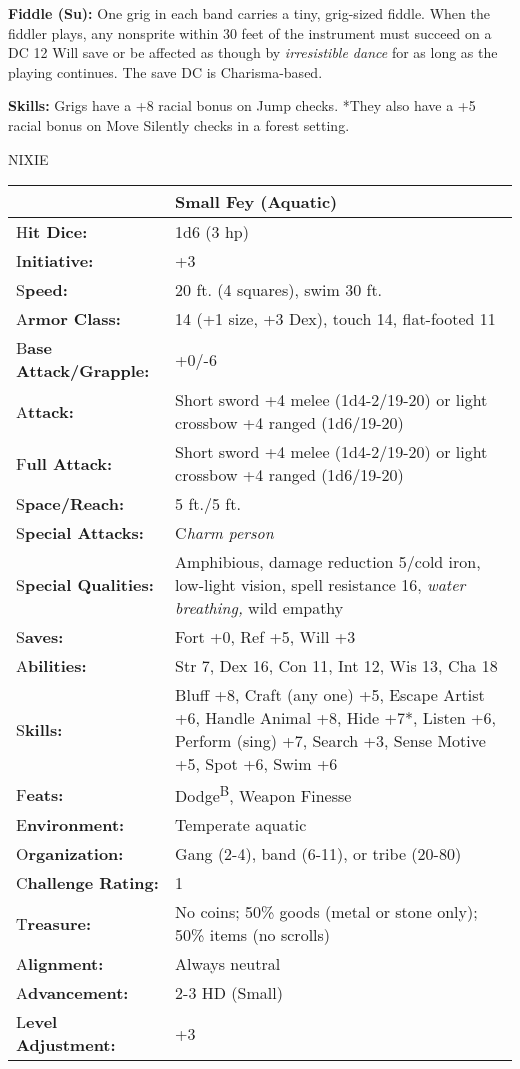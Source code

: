 \documentclass{article}
\begin{document}
\textbf{Fiddle (Su): }One grig in each band carries a tiny, grig-sized fiddle. 
When the fiddler plays, any nonsprite within 30 feet of the instrument must succeed 
on a DC 12 Will save or be affected as though by \textit{irresistible dance }for 
as long as the playing continues. The save DC is Charisma-based.

\textbf{Skills:} Grigs have a +8 racial bonus on Jump checks. *They also have a 
+5 racial bonus on Move Silently checks in a forest setting.

\vspace{12pt}
NIXIE

\begin{tabular}{|>{\raggedright}p{91pt}|>{\raggedright}p{195pt}|}
\hline
  & Small Fey (Aquatic)\tabularnewline
\hline
H\textbf{it Dice:} & 1d6 (3 hp)\tabularnewline
\hline
I\textbf{nitiative:} & +3\tabularnewline
\hline
S\textbf{peed:} & 20 ft. (4 squares), swim 30 ft.\tabularnewline
\hline
A\textbf{rmor Class:} & 14 (+1 size, +3 Dex), touch 14, flat-footed 11\tabularnewline
\hline
B\textbf{ase Attack/Grapple:} & +0/-6\tabularnewline
\hline
A\textbf{ttack:} & Short sword +4 melee (1d4-2/19-20) or light crossbow +4 ranged 
(1d6/19-20)\tabularnewline
\hline
F\textbf{ull Attack:} & Short sword +4 melee (1d4-2/19-20) or light crossbow +4 
ranged (1d6/19-20)\tabularnewline
\hline
S\textbf{pace/Reach:} & 5 ft./5 ft.\tabularnewline
\hline
S\textbf{pecial Attacks:} & C\textit{harm person}\tabularnewline
\hline
S\textbf{pecial Qualities:} & Amphibious, damage reduction 5/cold iron, low-light 
vision, spell resistance 16, \textit{water breathing, }wild empathy\tabularnewline
\hline
S\textbf{aves:} & Fort +0, Ref +5, Will +3\tabularnewline
\hline
A\textbf{bilities:} & Str 7, Dex 16, Con 11, Int 12, Wis 13, Cha 18\tabularnewline
\hline
S\textbf{kills:} & Bluff +8, Craft (any one) +5, Escape Artist +6, Handle Animal 
+8, Hide +7*, Listen +6, Perform (sing) +7, Search +3, Sense Motive +5, Spot +6, 
Swim +6\tabularnewline
\hline
F\textbf{eats:} & Dodge\textsuperscript{B}, Weapon Finesse\tabularnewline
\hline
E\textbf{nvironment:} & Temperate aquatic\tabularnewline
\hline
O\textbf{rganization:} & Gang (2-4), band (6-11), or tribe (20-80)\tabularnewline
\hline
C\textbf{hallenge Rating:} & 1\tabularnewline
\hline
T\textbf{reasure:} & No coins; 50\% goods (metal or stone only); 50\% items (no 
scrolls)\tabularnewline
\hline
A\textbf{lignment:} & Always neutral\tabularnewline
\hline
A\textbf{dvancement:} & 2-3 HD (Small)\tabularnewline
\hline
L\textbf{evel Adjustment:} & +3\tabularnewline
\hline
\end{tabular}
\end{document}
